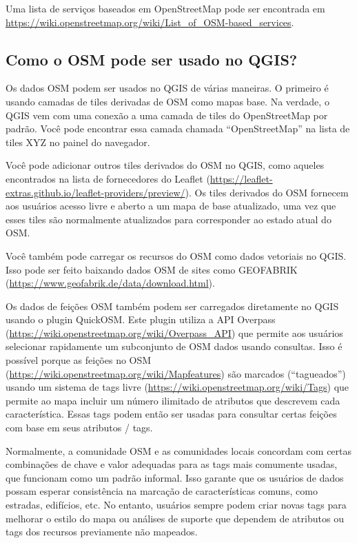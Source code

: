 \documentclass[
]{krantz}
\begin{document}
Uma lista de serviços baseados em OpenStreetMap pode ser encontrada em \url{https://wiki.openstreetmap.org/wiki/List_of_OSM-based_services}.

\hypertarget{como-o-osm-pode-ser-usado-no-qgis}{%
\subsection{Como o OSM pode ser usado no QGIS?}\label{como-o-osm-pode-ser-usado-no-qgis}}

Os dados OSM podem ser usados no QGIS de várias maneiras. O primeiro é usando camadas de tiles derivadas de OSM como mapas base. Na verdade, o QGIS vem com uma conexão a uma camada de tiles do OpenStreetMap por padrão. Você pode encontrar essa camada chamada ``OpenStreetMap'' na lista de tiles XYZ no painel do navegador.

Você pode adicionar outros tiles derivados do OSM no QGIS, como aqueles encontrados na lista de fornecedores do Leaflet (\href{https://leaflet-extras.github\%20.io\%20/\%20leaflet-owners\%20/\%20preview\%20/}{https://leaflet-extras.github.io/leaflet-providers/preview/}). Os tiles derivados do OSM fornecem aos usuários acesso livre e aberto a um mapa de base atualizado, uma vez que esses tiles são normalmente atualizados para corresponder ao estado atual do OSM.

Você também pode carregar os recursos do OSM como dados vetoriais no QGIS. Isso pode ser feito baixando dados OSM de sites como GEOFABRIK (\url{https://www.geofabrik.de/data/download.html}).

Os dados de feições OSM também podem ser carregados diretamente no QGIS usando o plugin QuickOSM. Este plugin utiliza a API Overpass (\url{https://wiki.openstreetmap.org/wiki/Overpass_API}) que permite aos usuários selecionar rapidamente um subconjunto de OSM dados usando consultas. Isso é possível porque as feições no OSM (\url{https://wiki.openstreetmap.org/wiki/Mapfeatures}) são marcados (``tagueados'') usando um sistema de tags livre (\url{https://wiki.openstreetmap.org/wiki/Tags}) que permite ao mapa incluir um número ilimitado de atributos que descrevem cada característica. Essas tags podem então ser usadas para consultar certas feições com base em seus atributos / tags.

Normalmente, a comunidade OSM e as comunidades locais concordam com certas combinações de chave e valor adequadas para as tags mais comumente usadas, que funcionam como um padrão informal. Isso garante que os usuários de dados possam esperar consistência na marcação de características comuns, como estradas, edifícios, etc. No entanto, usuários sempre podem criar novas tags para melhorar o estilo do mapa ou análises de suporte que dependem de atributos ou tags dos recursos previamente não mapeados.
\end{document}
